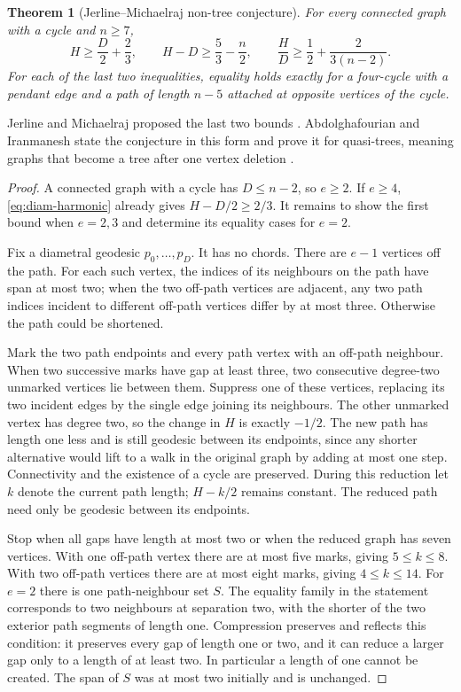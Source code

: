 \documentclass[11pt,a4paper]{article}
\newtheorem{theorem}{Theorem}[section]
\theoremstyle{remark}\newtheorem*{remark}{Remark}
\begin{document}
\begin{theorem}[Jerline--Michaelraj non-tree conjecture]\label{thm:jm-harm}
For every connected graph with a cycle and $n\ge7$,
\[
 H\ge\frac D2+\frac23,\qquad
 H-D\ge\frac53-\frac n2,\qquad
 \frac HD\ge\frac12+\frac{2}{3(n-2)}.
\]
For each of the last two inequalities, equality holds exactly for a four-cycle with a pendant edge and a path of length $n-5$ attached at opposite vertices of the cycle.
\end{theorem}

Jerline and Michaelraj proposed the last two bounds \cite{jm2016}. Abdolghafourian and Iranmanesh state the conjecture in this form and prove it for quasi-trees, meaning graphs that become a tree after one vertex deletion \cite{quasi2021}.

\begin{proof}
A connected graph with a cycle has $D\le n-2$, so $e\ge2$. If $e\ge4$, \eqref{eq:diam-harmonic} already gives $H-D/2\ge2/3$. It remains to show the first bound when $e=2,3$ and determine its equality cases for $e=2$.

Fix a diametral geodesic $p_0,\ldots,p_D$. It has no chords. There are $e-1$ vertices off the path. For each such vertex, the indices of its neighbours on the path have span at most two; when the two off-path vertices are adjacent, any two path indices incident to different off-path vertices differ by at most three. Otherwise the path could be shortened.

Mark the two path endpoints and every path vertex with an off-path neighbour. When two successive marks have gap at least three, two consecutive degree-two unmarked vertices lie between them. Suppress one of these vertices, replacing its two incident edges by the single edge joining its neighbours. The other unmarked vertex has degree two, so the change in $H$ is exactly $-1/2$. The new path has length one less and is still geodesic between its endpoints, since any shorter alternative would lift to a walk in the original graph by adding at most one step. Connectivity and the existence of a cycle are preserved. During this reduction let $k$ denote the current path length; $H-k/2$ remains constant. The reduced path need only be geodesic between its endpoints.

Stop when all gaps have length at most two or when the reduced graph has seven vertices. With one off-path vertex there are at most five marks, giving $5\le k\le8$. With two off-path vertices there are at most eight marks, giving $4\le k\le14$. For $e=2$ there is one path-neighbour set $S$. The equality family in the statement corresponds to two neighbours at separation two, with the shorter of the two exterior path segments of length one. Compression preserves and reflects this condition: it preserves every gap of length one or two, and it can reduce a larger gap only to a length of at least two. In particular a length of one cannot be created. The span of $S$ was at most two initially and is unchanged.


\end{proof}
\end{document}
